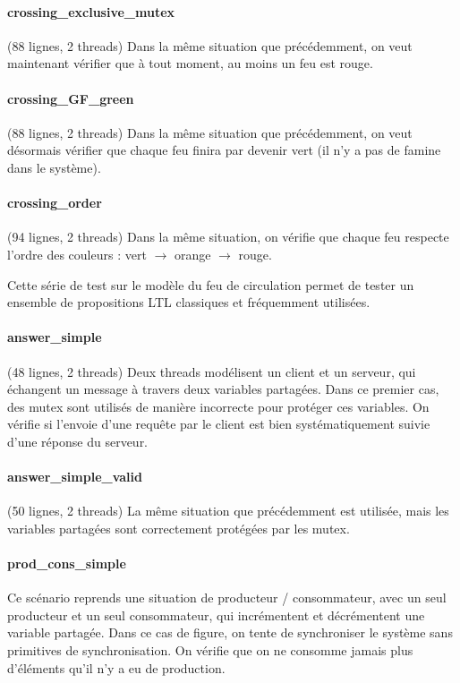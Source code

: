 \paragraph{crossing\_exclusive\_mutex}
(88 lignes, 2 threads)
Dans la même situation que précédemment, on veut maintenant vérifier que à tout
moment, au moins un feu est rouge.

\paragraph{crossing\_GF\_green}
(88 lignes, 2 threads)
Dans la même situation que précédemment, on veut désormais vérifier que chaque
feu finira par devenir vert (il n'y a pas de famine dans le système).

\paragraph{crossing\_order}
(94 lignes, 2 threads)
Dans la même situation, on vérifie que chaque feu respecte l'ordre des couleurs
: vert $\rightarrow$ orange $\rightarrow$ rouge.

Cette série de test sur le modèle du feu de circulation permet de tester un
ensemble de propositions LTL classiques et fréquemment utilisées.

\paragraph{answer\_simple}
(48 lignes, 2 threads)
Deux threads modélisent un client et un serveur, qui échangent un message à
travers deux variables partagées. Dans ce premier cas, des mutex sont utilisés
de manière incorrecte pour protéger ces variables. On vérifie si l'envoie d'une
requête par le client est bien systématiquement suivie d'une réponse du serveur.

\paragraph{answer\_simple\_valid}
(50 lignes, 2 threads)
La même situation que précédemment est utilisée, mais les variables partagées sont
correctement protégées par les mutex.

\paragraph{prod\_cons\_simple}
Ce scénario reprends une situation de producteur / consommateur, avec un seul
producteur et un seul consommateur, qui
incrémentent et décrémentent une variable partagée. Dans ce cas de figure, on
tente de synchroniser le système sans primitives de synchronisation. On vérifie
que on ne consomme jamais plus d'éléments qu'il n'y a eu de production.

